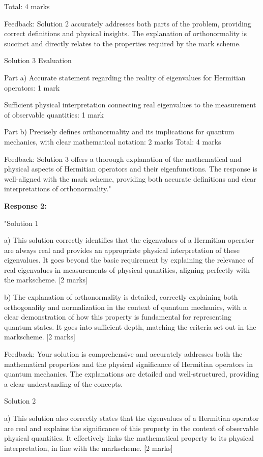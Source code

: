 \documentclass[a4paper,11pt]{article}
\begin{document}
Total: 4 marks

Feedback: Solution 2 accurately addresses both parts of the problem, providing correct definitions and physical insights. The explanation of orthonormality is succinct and directly relates to the properties required by the mark scheme.

Solution 3 Evaluation

Part a)
Accurate statement regarding the reality of eigenvalues for Hermitian operators: 1 mark

Sufficient physical interpretation connecting real eigenvalues to the measurement of observable quantities: 1 mark

Part b)
Precisely defines orthonormality and its implications for quantum mechanics, with clear mathematical notation: 2 marks
Total: 4 marks

Feedback: Solution 3 offers a thorough explanation of the mathematical and physical aspects of Hermitian operators and their eigenfunctions. The response is well-aligned with the mark scheme, providing both accurate definitions and clear interpretations of orthonormality."

\textbf{Response 2:}

"Solution 1

a) This solution correctly identifies that the eigenvalues of a Hermitian operator are always real and provides an appropriate physical interpretation of these eigenvalues. It goes beyond the basic requirement by explaining the relevance of real eigenvalues in measurements of physical quantities, aligning perfectly with the markscheme. [2 marks]

b) The explanation of orthonormality is detailed, correctly explaining both orthogonality and normalization in the context of quantum mechanics, with a clear demonstration of how this property is fundamental for representing quantum states. It goes into sufficient depth, matching the criteria set out in the markscheme. [2 marks]

Feedback: Your solution is comprehensive and accurately addresses both the mathematical properties and the physical significance of Hermitian operators in quantum mechanics. The explanations are detailed and well-structured, providing a clear understanding of the concepts.

Solution 2

a) This solution also correctly states that the eigenvalues of a Hermitian operator are real and explains the significance of this property in the context of observable physical quantities. It effectively links the mathematical property to its physical interpretation, in line with the markscheme. [2 marks]
\end{document}
